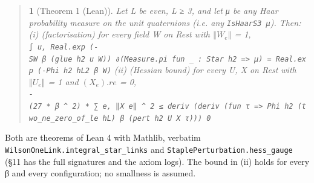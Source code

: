 \documentclass[11pt,a4paper]{article}
\theoremstyle{named}
\newtheorem*{namedthm}{}
\begin{document}
\begin{quote}
\begin{namedthm}[Theorem 1 (Lean)]
Let L be even, L ≥ 3, and let μ be any Haar probability measure on the unit quaternions (i.e. any \texttt{IsHaarS3\ \allowbreak{}μ}). Then: (i) \textit{(factorisation)} for every field W on Rest with $‖W_e‖$ = 1,\\
\texttt{∫\ \allowbreak{}u,\ \allowbreak{}Real.\allowbreak{}exp\ \allowbreak{}(-SW\ \allowbreak{}β\ \allowbreak{}(glue\ \allowbreak{}h2\ \allowbreak{}u\ \allowbreak{}W))\ \allowbreak{}∂(Measure.\allowbreak{}pi\ \allowbreak{}fun\ \allowbreak{}\_\allowbreak{}\ \allowbreak{}:\ \allowbreak{}Star\ \allowbreak{}h2\ \allowbreak{}=\textgreater{}\ \allowbreak{}μ)\ \allowbreak{}=\ \allowbreak{}Real.\allowbreak{}exp\ \allowbreak{}(-Phi\ \allowbreak{}h2\ \allowbreak{}hL2\ \allowbreak{}β\ \allowbreak{}W)} (ii) \textit{(Hessian bound)} for every U, X on Rest with $‖U_e‖$ = 1 and $(X_e).re$ = 0,\\
\texttt{-(27\ \allowbreak{}*\ \allowbreak{}β\ \allowbreak{}\textasciicircum{}\ \allowbreak{}2)\ \allowbreak{}*\ \allowbreak{}∑\ \allowbreak{}e,\ \allowbreak{}‖X\ \allowbreak{}e‖\ \allowbreak{}\textasciicircum{}\ \allowbreak{}2\ \allowbreak{}≤\ \allowbreak{}deriv\ \allowbreak{}(deriv\ \allowbreak{}(fun\ \allowbreak{}τ\ \allowbreak{}=\textgreater{}\ \allowbreak{}Phi\ \allowbreak{}h2\ \allowbreak{}(two\_\allowbreak{}ne\_\allowbreak{}zero\_\allowbreak{}of\_\allowbreak{}le\ \allowbreak{}hL)\ \allowbreak{}β\ \allowbreak{}(pert\ \allowbreak{}h2\ \allowbreak{}U\ \allowbreak{}X\ \allowbreak{}τ)))\ \allowbreak{}0}
\end{namedthm}
\end{quote}
Both are theorems of Lean 4 with Mathlib, verbatim \texttt{WilsonOneLink.\allowbreak{}integral\_\allowbreak{}star\_\allowbreak{}links} and \texttt{StaplePerturbation.\allowbreak{}hess\_\allowbreak{}gauge} (§11 has the full signatures and the axiom logs). The bound in (ii) holds for every β and every configuration; no smallness is assumed.
\end{document}
